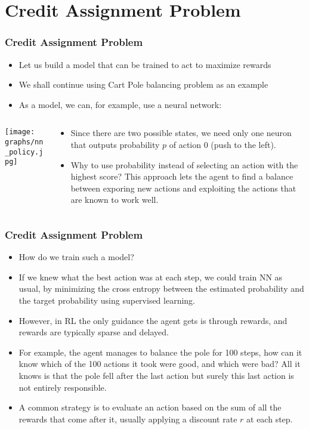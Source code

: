 \section{Credit Assignment Problem}
\begin{frame}[fragile]
  \frametitle{Credit Assignment Problem}
  \begin{itemize}
  \item Let us build a model that can be trained to act to maximize rewards
  \item We shall continue using Cart Pole balancing problem as an example
  \item As a model, we can, for example, use a neural network:
  \end{itemize}

  \begin{columns}
    \begin{column}{0.5\textwidth}
    \texttt{[image: graphs/nn\_policy.jpg]}
    \end{column}
    \begin{column}{0.5\textwidth}
      \begin{itemize}
      \item Since there are two possible states, we need only one neuron that outputs probability $p$ of action 0 (push to the left).
      \item Why to use probability instead of selecting an action with the highest score? This approach lets the agent to find a 
        balance between {\color{mycolordef}exporing} new actions and {\color{mycolordef}exploiting} the 
        actions that are known to work well.
      \end{itemize}
    \end{column}
    \end{columns}
\end{frame}


\begin{frame}[fragile]
  \frametitle{Credit Assignment Problem}
  \begin{itemize}
  \item How do we train such a model?
  \item If we knew what the best action was at each step, we could train NN as usual,
    by minimizing the cross entropy between the estimated probability and the target probability using supervised learning.
  \item However, in RL the only guidance the agent gets is through rewards, and rewards
    are typically sparse and delayed.
  \item For example, the agent manages to balance the pole for 100 steps, how can it know which of the 100 actions it took were good, and which were bad? All it knows is that the pole fell after the last action
    but surely this last action is not entirely responsible.
  \item A common strategy is to evaluate an action based on the sum of all the rewards that come after it, usually applying a {\color{mycolordef}discount rate} $r$ at each step.
  \end{itemize}
\end{frame}


